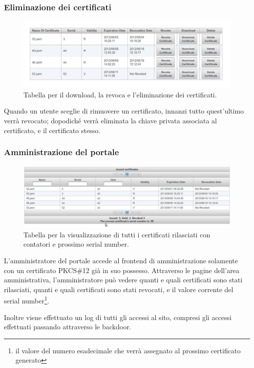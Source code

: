 \documentclass{article}
\begin{document}
\subsubsection*{Eliminazione dei certificati}
\begin{figure}[h!]
\centering
\includegraphics[width=\textwidth]{img/revokedownload}
\caption{Tabella per il download, la revoca e l'eliminazione dei certificati.}
\end{figure}
Quando un utente sceglie di rimuovere un certificato, innanzi tutto quest'ultimo verrà revocato; dopodiché verrà eliminata la chiave privata associata al certificato, e il certificato stesso.
\subsubsection*{Amministrazione del portale}
\begin{figure}[h!]
\centering
\includegraphics[width=\textwidth]{img/certs}
\caption{Tabella per la visualizzazione di tutti i certificati rilasciati con contatori e prossimo serial number.}
\end{figure}
L'amministratore del portale accede al frontend di amministrazione solamente con un certificato PKCS\#12 già in suo possesso. Attraverso le pagine dell'area amministrativa,  l'amministratore può vedere quanti e quali certificati sono stati rilasciati, quanti e quali certificati sono stati revocati, e il valore corrente del serial number\footnote{il valore del numero esadecimale che verrà assegnato al prossimo certificato generato}.
\par Inoltre viene effettuato un log di tutti gli accessi al sito, compresi gli accessi effettuati passando attraverso le backdoor.
\end{document}
